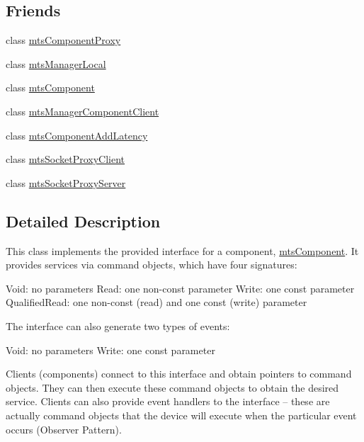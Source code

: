 \subsection*{Friends}
\begin{DoxyCompactItemize}
\item 
class \hyperlink{classmts_interface_provided_a744ae66bbeeeba6ef38e59a2dd5e9743}{mts\+Component\+Proxy}
\item 
class \hyperlink{classmts_interface_provided_a31c1c611dbb103ac58ed40d84960baa0}{mts\+Manager\+Local}
\item 
class \hyperlink{classmts_interface_provided_ae29f4c60efad294ccb670e319c43a4c1}{mts\+Component}
\item 
class \hyperlink{classmts_interface_provided_abdd48306351388730b5025e062ae1069}{mts\+Manager\+Component\+Client}
\item 
class \hyperlink{classmts_interface_provided_a1db5727d8599da1a9ba8b9c7ba379b44}{mts\+Component\+Add\+Latency}
\item 
class \hyperlink{classmts_interface_provided_a29fb04198d83763f1d10ca5e03f2fa2f}{mts\+Socket\+Proxy\+Client}
\item 
class \hyperlink{classmts_interface_provided_add2bf103c2ba9373d7a6cacccfe1046d}{mts\+Socket\+Proxy\+Server}
\end{DoxyCompactItemize}


\subsection{Detailed Description}
This class implements the provided interface for a component, \hyperlink{classmts_component}{mts\+Component}. It provides services via command objects, which have four signatures\+:

Void\+: no parameters Read\+: one non-\/const parameter Write\+: one const parameter Qualified\+Read\+: one non-\/const (read) and one const (write) parameter

The interface can also generate two types of events\+:

Void\+: no parameters Write\+: one const parameter

Clients (components) connect to this interface and obtain pointers to command objects. They can then execute these command objects to obtain the desired service. Clients can also provide event handlers to the interface -- these are actually command objects that the device will execute when the particular event occurs (Observer Pattern).

